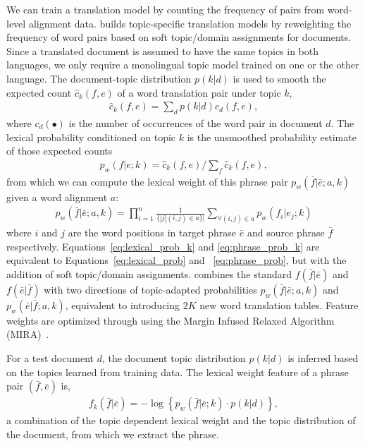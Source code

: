 We can train a translation model by counting the frequency of pairs from word-level alignment data.
\citet{Eidelman-12} builds topic-specific translation models by reweighting the frequency of word pairs based on soft topic/domain assignments for documents.
Since a translated document is assumed to have the same topics in both languages, we only require a monolingual topic model trained on one or the other language.
The document-topic distribution $p(k|d)$ is used
to smooth the expected count $\hat{c}_{k}(f,e)$ of a word translation
pair under topic $k$,
\begin{align}
\textstyle \hat{c}_{k}(f,e) = \sum_{d}{p(k|d)c_d(f,e)},
\end{align}
where $c_d(\bullet)$ is the number of occurrences of the word pair in
document $d$.  The lexical probability conditioned on topic $k$ is the
unsmoothed probability estimate of those expected counts
\begin{align}
\label{eq:lexical_prob_k}
\textstyle p_w(f|e;k) = \hat{c}_{k}(f,e) / \sum_f{\hat{c}_{k}(f,e)},
\end{align}
from which we can compute the lexical weight of this phrase pair
$p_w(\bar{f}|\bar{e};a, k)$ given a word alignment $a$\citep{koehn-03}:
\begin{align}
\label{eq:phrase_prob_k}
p_w(\bar{f} | \bar{e};a, k) = \prod^{n}_{i=1} \frac{1}{\{|j | (i, j) \in a\}|} \sum_{\forall (i,j) \in a} p_w(f_i | e_j; k)
\end{align}
where $i$ and $j$ are the word positions in target phrase $\bar{e}$
and source phrase $\bar{f}$ respectively. 
Equations~\ref{eq:lexical_prob_k} and \ref{eq:phrase_prob_k} are equivalent to Equations~\ref{eq:lexical_prob} and ~\ref{eq:phrase_prob}, but with the addition of soft topic/domain assignments.
\citet{Eidelman-12} combines the standard $f(\bar{f}|\bar{e})$ and
$f(\bar{e}|\bar{f})$ with two directions of
topic-adapted probabilities 
$p_w(\bar{f} | \bar{e};a, k)$ and $p_w(\bar{e} | \bar{f};a, k)$, equivalent to introducing $2K$ new word translation tables. 
Feature weights are optimized through
using the Margin Infused Relaxed
  Algorithm (MIRA)~\cite[\textsc{mira}]{Crammer-06}.

For a test document $d$, the document topic distribution $p(k | d)$ is
inferred based on the topics learned from training data. The lexical
weight feature of a phrase pair $(\bar{f}, \bar{e})$ is,
\begin{align}
\textstyle f_{k}(\bar{f}|\bar{e})=-\log\left\{{p_{w}(\bar{f}|\bar{e};k)\cdot p(k|d)}\right\},
\end{align}
a combination of the topic dependent lexical weight and the topic
distribution of the document, from which we extract the phrase.

